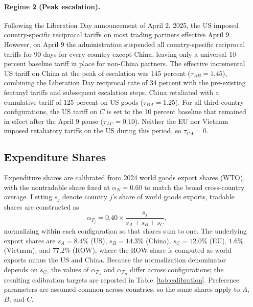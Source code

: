 \documentclass[11pt]{article}
\theoremstyle{plain}
\theoremstyle{remark}
\numberwithin{lemma}{section}
\numberwithin{proposition}{section}
\numberwithin{corollary}{section}
\begin{document}
\begin{appendix}
\paragraph{Regime 2 (Peak escalation).} Following the Liberation Day announcement of April 2, 2025, the US imposed country-specific reciprocal tariffs on most trading partners effective April 9. However, on April 9 the administration suspended all country-specific reciprocal tariffs for 90 days for every country except China, leaving only a universal 10 percent baseline tariff in place for non-China partners. The effective incremental US tariff on China at the peak of escalation was 145 percent ($\tau_{AB} = 1.45$), combining the Liberation Day reciprocal rate of 34 percent with the pre-existing fentanyl tariffs and subsequent escalation steps. China retaliated with a cumulative tariff of 125 percent on US goods ($\tau_{BA} = 1.25$). For all third-country configurations, the US tariff on $C$ is set to the 10 percent baseline that remained in effect after the April 9 pause ($\tau_{AC} = 0.10$). Neither the EU nor Vietnam imposed retaliatory tariffs on the US during this period, so $\tau_{CA} = 0$.

\subsection*{Expenditure Shares}
Expenditure shares are calibrated from 2024 world goods export shares (WTO), with the nontradable share fixed at $\alpha_N = 0.60$ to match the broad cross-country average. Letting $s_j$ denote country $j$'s share of world goods exports, tradable shares are constructed as
\[
\alpha_{T_j} = 0.40 \times \frac{s_j}{s_A + s_B + s_C},
\]
normalizing within each configuration so that shares sum to one. The underlying export shares are $s_A = 8.4\%$ (US), $s_B = 14.3\%$ (China), $s_C = 12.0\%$ (EU), $1.6\%$ (Vietnam), and $77.2\%$ (ROW), where the ROW share is computed as world exports minus the US and China. Because the normalization denominator depends on $s_C$, the values of $\alpha_{T_A}$ and $\alpha_{T_B}$ differ across configurations; the resulting calibration targets are reported in Table~\ref{tab:calibration}. Preference parameters are assumed common across countries, so the same shares apply to $A$, $B$, and $C$.


\end{appendix}
\end{document}
